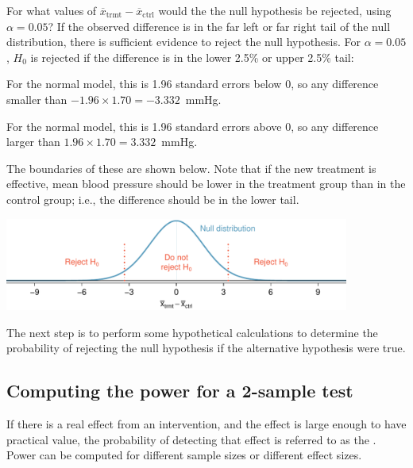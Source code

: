 \begin{example}{For what values of $\overline{x}_{\text{trmt}} - \overline{x}_{\text{ctrl}}$ would the the null hypothesis be rejected, using $\alpha = 0.05$?}
If the observed difference is in the far left or far right tail of the null distribution, there is sufficient evidence to reject the null hypothesis.
For $\alpha = 0.05$, $H_0$ is rejected if the difference is in the lower 2.5\% or upper 2.5\% tail:
\begin{description}
\setlength{\itemsep}{0mm}
\item[Lower 2.5\%:] For the normal model, this is 1.96 standard errors below 0, so any difference smaller than $-1.96 \times 1.70 = -3.332$~mmHg.
\item[Upper 2.5\%:] For the normal model, this is 1.96 standard errors above 0, so any difference larger than $1.96 \times 1.70 = 3.332$~mmHg.
\end{description}
The boundaries of these  are shown below. Note that if the new treatment is effective, mean blood pressure should be lower in the treatment group than in the control group; i.e., the difference should be in the lower tail.
\begin{center}
\includegraphics[width=0.85\textwidth]{ch_inference_for_means_oi_biostat/figures/power_null_0_1-7/power_null_B_0_1-7_with_rejection_region}
\end{center}
\end{example}

The next step is to perform some hypothetical calculations to determine the probability of rejecting the null hypothesis if the alternative hypothesis were true.

\subsection{Computing the power for a 2-sample test}

If there is a real effect from an intervention, and the effect is large enough to have practical value, the probability of detecting that effect is referred to as the . Power can be computed for different sample sizes or different effect sizes. 

